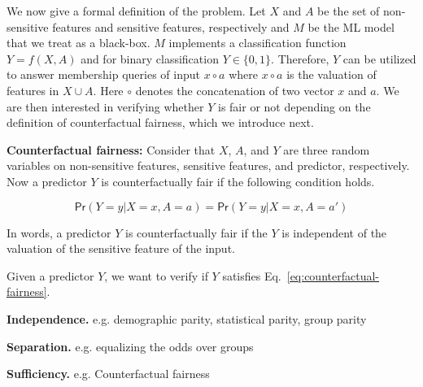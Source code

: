 We now give a formal definition of the problem. Let $ X $ and $ A $ be the set of non-sensitive features and sensitive features, respectively and $ M $ be the ML model that we treat as a black-box. $ M $ implements a classification function $ Y=f(X,A) $  and for binary classification $ Y \in \{0,1\} $. Therefore, $ Y $ can be utilized to answer membership queries of input $ x\circ a  $ where $ x \circ a $ is the valuation of features in $ X \cup A $. Here $ \circ $ denotes the concatenation of two vector $ x $ and $ a $.   We are then interested in verifying whether $ Y $ is fair or not depending on the definition of counterfactual fairness, which we introduce next.

\textbf{Counterfactual fairness:} Consider that $ X $, $ A $, and $ Y $ are three random variables on non-sensitive features, sensitive features, and predictor, respectively. Now a predictor $ Y $ is counterfactually fair if the following condition holds. 

\begin{equation}
\label{eq:counterfactual-fairness}
\mathsf{Pr}(Y = y| X=x, A=a) = \mathsf{Pr}(Y=y| X=x, A=a')
\end{equation}

In words,  a predictor $ Y $ is counterfactually fair if the $ Y $  is independent of the  valuation of the sensitive feature of the input. 

Given a predictor $ Y $, we want to verify if $ Y $ satisfies Eq.~\ref{eq:counterfactual-fairness}. 


\textbf{Independence.} e.g. demographic parity, statistical parity, group parity

\textbf{Separation.} e.g. equalizing the odds over groups

\textbf{Sufficiency.} e.g. Counterfactual fairness





	
	
